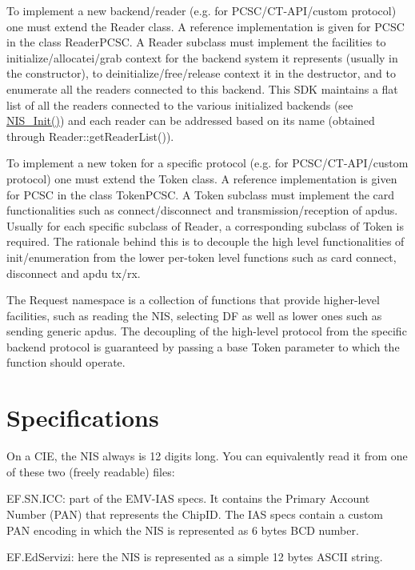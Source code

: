 To implement a new backend/reader (e.\-g. for P\-C\-S\-C/\-C\-T-\/\-A\-P\-I/custom protocol) one must extend the Reader class. A reference implementation is given for P\-C\-S\-C in the class Reader\-P\-C\-S\-C. A Reader subclass must implement the facilities to initialize/allocatei/grab context for the backend system it represents (usually in the constructor), to deinitialize/free/release context it in the destructor, and to enumerate all the readers connected to this backend. This S\-D\-K maintains a flat list of all the readers connected to the various initialized backends (see \hyperlink{nis_8cpp_a1a4da622cc9443c4fc71b276454923da}{N\-I\-S\-\_\-\-Init()}) and each reader can be addressed based on its name (obtained through Reader\-::get\-Reader\-List()).

To implement a new token for a specific protocol (e.\-g. for P\-C\-S\-C/\-C\-T-\/\-A\-P\-I/custom protocol) one must extend the Token class. A reference implementation is given for P\-C\-S\-C in the class Token\-P\-C\-S\-C. A Token subclass must implement the card functionalities such as connect/disconnect and transmission/reception of apdus. Usually for each specific subclass of Reader, a corresponding subclass of Token is required. The rationale behind this is to decouple the high level functionalities of init/enumeration from the lower per-\/token level functions such as card connect, disconnect and apdu tx/rx.

The Request namespace is a collection of functions that provide higher-\/level facilities, such as reading the N\-I\-S, selecting D\-F as well as lower ones such as sending generic apdus. The decoupling of the high-\/level protocol from the specific backend protocol is guaranteed by passing a base Token parameter to which the function should operate.\hypertarget{index_sec-specs}{}\section{Specifications}\label{index_sec-specs}
On a C\-I\-E, the N\-I\-S always is 12 digits long. You can equivalently read it from one of these two (freely readable) files\-:
\begin{DoxyItemize}
\item E\-F.\-S\-N.\-I\-C\-C\-: part of the E\-M\-V-\/\-I\-A\-S specs. It contains the Primary Account Number (P\-A\-N) that represents the Chip\-I\-D. The I\-A\-S specs contain a custom P\-A\-N encoding in which the N\-I\-S is represented as 6 bytes B\-C\-D number.
\item E\-F.\-Ed\-Servizi\-: here the N\-I\-S is represented as a simple 12 bytes A\-S\-C\-I\-I string. 
\end{DoxyItemize}